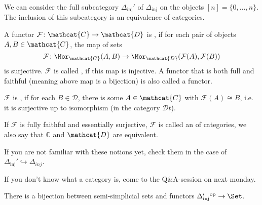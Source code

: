 \begin{remark}\label{rm:delta-inj-prime-full-subcategory}
    We can consider the full subcategory $\Delta_\text{inj}'$ of $\Delta_\text{inj}$ on the objects $[n] = \{0,\ldots,n\}$. The inclusion of this subcategory is an equivalence of categories.
\end{remark}

\begin{recap}
    A functor $\mathcal{F}\colon  \mathcat{C}\to \mathcat{D}$ is , if for each pair of objects $A,B \in \mathcat{C}$, the map of sets
    \[
        \mathcal{F}\colon \Mor_{\mathcat{C}}(A,B) \to  \Mor_{\mathcat{D}}(\mathcal{F}(A),\mathcal{F}(B))
    \] 
    is surjective. $\mathcal{F}$ is called , if this map is injective. A functor that is both full and faithful (meaning above map is a bijection) is also called a  functor. 

    $\mathcal{F}$ is , if for each $B\in \mathcal{D}$, there is some $A\in \mathcat{C}$ with $\mathcal{F}(A) \cong B$, i.e. it is surjective up to isomorphism (in the category $\mathcal{D}t$).

    If $\mathcal{F}$ is fully faithful and essentially surjective, $\mathcal{F}$ is called an  of categories, we also say that $\mathbb{C}$ and $\mathcat{D}$ are equivalent.

    If you are not familiar with these notions yet, check them in the case of $\Delta_{\text{inj}}'\hookrightarrow \Delta_{inj}$.
\end{recap}

\begin{orga}
    If you don't know what a category is, come to the Q\&A-session on next monday.
\end{orga}

\begin{lemma}\label{lm:semi-simplicial-sets-are-equivalent-to-functors-from-delta-inj-prime-to-set}
    There is a bijection between semi-simplicial sets and functors  $\Delta'_{\text{inj}}{}^\text{op} \to  \Set$.
\end{lemma}

